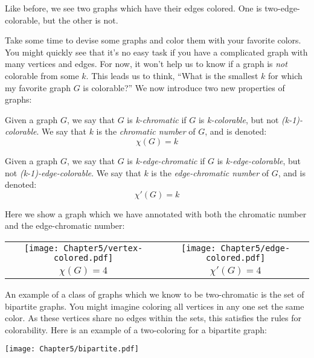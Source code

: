 Like before, we see two graphs which have their edges colored. One is two-edge-colorable, but the other is not.


Take some time to devise some graphs and color them with your favorite colors. You might quickly see that it's no easy task if you have a complicated graph with many vertices and edges. For now, it won't help us to know if a graph is \textit{not} colorable from some $k$. This leads us to think, ``What is the smallest $k$ for which my favorite graph $G$ is colorable?'' We now introduce two new properties of graphs:

\begin{definition}[K-Chromatic]
    Given a graph $G$, we say that $G$ is \textit{k-chromatic} if $G$ is \textit{k-colorable}, but not \textit{(k-1)-colorable}. We say that $k$ is the \textit{chromatic number} of $G$, and is denoted:
    \[\chi(G) = k\]
\end{definition}

\begin{definition}
    Given a graph $G$, we say that $G$ is \textit{k-edge-chromatic} if $G$ is \textit{k-edge-colorable}, but not \textit{(k-1)-edge-colorable}. We say that $k$ is the \textit{edge-chromatic number} of $G$, and is denoted:
    \[ \chi\prime(G) = k \]
\end{definition}

Here we show a graph which we have annotated with both the chromatic number and the edge-chromatic number:

\begin{center}
    \begin{tabular}{c c}
        \texttt{[image: Chapter5/vertex-colored.pdf]} &
        \texttt{[image: Chapter5/edge-colored.pdf]} \\
        $\chi(G) = 4$ & $\chi\prime(G) = 4$
    \end{tabular}
\end{center}

An example of a class of graphs which we know to be two-chromatic is the set of bipartite graphs. You might imagine coloring all vertices in any one set the same color. As these vertices share no edges within the sets, this satisfies the rules for colorability. Here is an example of a two-coloring for a bipartite graph:

\begin{center}
    \texttt{[image: Chapter5/bipartite.pdf]}
\end{center}

